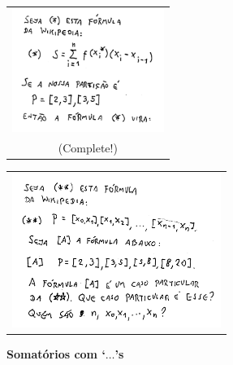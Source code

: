 \documentclass[oneside,12pt]{article}
\begin{document}
\begin{tabular}{c}
\includegraphics[height=4cm]{2021-2-C2/20211124_wp_1.pdf} \\
(Complete!) \\
\end{tabular}
%
%
\begin{tabular}{c}
\includegraphics[height=5cm]{2021-2-C2/20211124_wp_2.pdf}
\end{tabular}

\newpage


{\bf Somatórios com `$\ldots$'s}
\end{document}
